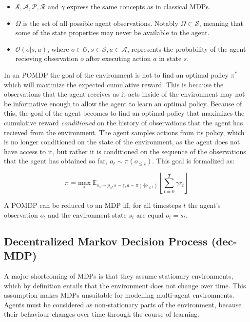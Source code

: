 \documentclass{../main.tex}{subfile}
\begin{document}
\begin{itemize}
    \item $\mathcal{S}, \mathcal{A}, \mathcal{P}, \mathcal{R}$ and $\gamma$ express the same concepts as in classical MDPs.
    \item $\Omega$ is the set of all possible agent observations. Notably $\Omega \subset \mathcal{S}$, meaning that some of the state properties may never be available to the agent.
    \item $\mathcal{O}(o | s, a)$, where $o \in \mathcal{O}, s \in \mathcal{S}, a \in \mathcal{A}$, represents the probability of the agent recieving observation $o$ after executing action $a$ in state $s$. 
\end{itemize}

In an POMDP the goal of the environment is not to find an optimal policy $\pi^*$ which will maximize the expected cumulative reward. This is because the observations that the agent receives as it acts inside of the environment may not be informative enough to allow the agent to learn an optimal policy. Because of this, the goal of the agent becomes to find an optimal policy that maximizes the cumulative reward \textit{conditioned} on the history of observations that the agent has recieved from the environment. The agent samples actions from its policy, which is no longer conditioned on the state of the environment, as the agent does not have access to it, but rather it is conditioned on the sequence of the observations that the agent has obtained so far, $a_t \sim \pi(o_{\leq t})$. This goal is formalized as:

        \begin{equation}
        \pi^{} = \underset{\pi}{\text{max}}\;  \mathbb{E}_{s_0 \sim \rho_0, s \sim \xi, a \sim \pi(\cdot | o_{\leq t})}[\sum_{t=0}^{T} \gamma r_t]
        \end{equation}

A POMDP can be reduced to an MDP iff, for all timesteps $t$ the agent's observation $o_t$ and the environment state $s_t$ are equal $o_t = s_t$.

\subsection{Decentralized Markov Decision Process (dec-MDP)}

A major shortcoming of MDPs is that they assume stationary environments, which by definition entails that the environment does not change over time. This assumption makes MDPs unsuitable for modelling multi-agent environments. Agents must be considered as non-stationary parts of the environment, because their behaviour changes over time through the course of learning.
\end{document}
